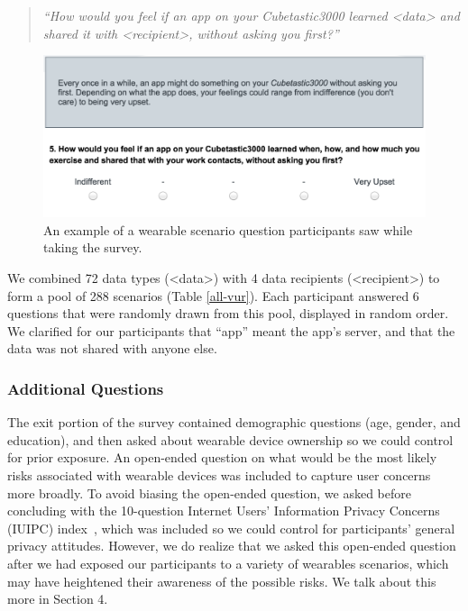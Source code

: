 \documentclass{sig-alternate-hotpets15}
\begin{document}
\begin{quotation}
\noindent
\textit{``How would you feel if an app on your Cubetastic3000 learned <data> and shared it with <recipient>, without asking you first?''}
\end{quotation}

\begin{figure}[t]
	\centering
	\includegraphics[width=\columnwidth]{images/prompt.png}
	\caption{An example of a wearable scenario question participants saw while taking the survey.}
	\label{fig:prompt}
\end{figure}

We combined 72 data types (<data>) with 4 data recipients (<recipient>) to form a pool of 288 scenarios (Table \ref{all-vur}). Each participant answered 6 questions that were randomly drawn from this pool, displayed in random order. We clarified for our participants that ``app'' meant the app's server, and that the data was not shared with anyone else. 

\subsubsection{Additional Questions}
The exit portion of the survey contained demographic questions (age, gender, and education), and then asked about wearable device ownership so we could control for prior exposure. An open-ended question on what would be the most likely risks associated with wearable devices was included to capture user concerns more broadly. To avoid biasing the open-ended question, we asked before concluding with the 10-question Internet Users' Information Privacy Concerns (IUIPC) index~\cite{malhotra2004internet}, which was included so we could control for participants' general privacy attitudes. However, we do realize that we asked this open-ended question after we had exposed our participants to a variety of wearables scenarios, which may have heightened their awareness of the possible risks. We talk about this more in Section 4. 
\end{document}
